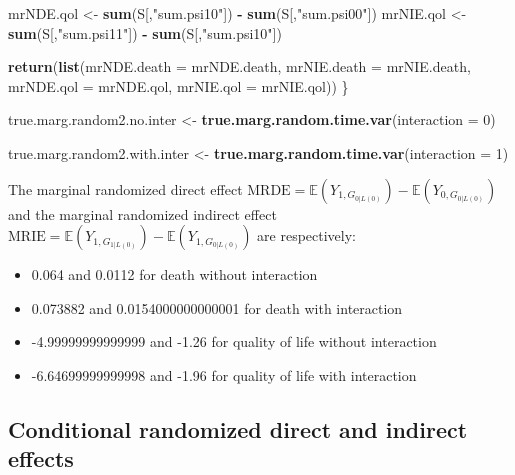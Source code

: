 \documentclass[
]{book}
\newenvironment{Shaded}{\begin{snugshade}}{\end{snugshade}}
\newcommand{\AttributeTok}[1]{\textcolor[rgb]{0.13,0.29,0.53}{#1}}
\newcommand{\DecValTok}[1]{\textcolor[rgb]{0.00,0.00,0.81}{#1}}
\newcommand{\FunctionTok}[1]{\textcolor[rgb]{0.13,0.29,0.53}{\textbf{#1}}}
\newcommand{\NormalTok}[1]{#1}
\newcommand{\OtherTok}[1]{\textcolor[rgb]{0.56,0.35,0.01}{#1}}
\newcommand{\SpecialCharTok}[1]{\textcolor[rgb]{0.81,0.36,0.00}{\textbf{#1}}}
\newcommand{\StringTok}[1]{\textcolor[rgb]{0.31,0.60,0.02}{#1}}
\providecommand{\tightlist}{%
  \setlength{\itemsep}{0pt}\setlength{\parskip}{0pt}}
\begin{document}
\begin{Shaded}
\begin{Highlighting}[]
\NormalTok{  mrNDE.qol }\OtherTok{\textless{}{-}} \FunctionTok{sum}\NormalTok{(S[,}\StringTok{"sum.psi10"}\NormalTok{]) }\SpecialCharTok{{-}} \FunctionTok{sum}\NormalTok{(S[,}\StringTok{"sum.psi00"}\NormalTok{])}
\NormalTok{  mrNIE.qol }\OtherTok{\textless{}{-}} \FunctionTok{sum}\NormalTok{(S[,}\StringTok{"sum.psi11"}\NormalTok{]) }\SpecialCharTok{{-}} \FunctionTok{sum}\NormalTok{(S[,}\StringTok{"sum.psi10"}\NormalTok{])}
  
  \FunctionTok{return}\NormalTok{(}\FunctionTok{list}\NormalTok{(}\AttributeTok{mrNDE.death =}\NormalTok{ mrNDE.death, }\AttributeTok{mrNIE.death =}\NormalTok{ mrNIE.death, }
              \AttributeTok{mrNDE.qol =}\NormalTok{ mrNDE.qol, }\AttributeTok{mrNIE.qol =}\NormalTok{ mrNIE.qol))}
\NormalTok{\}}
\end{Highlighting}
\end{Shaded}

\begin{Shaded}
\begin{Highlighting}[]
\NormalTok{true.marg.random2.no.inter }\OtherTok{\textless{}{-}} \FunctionTok{true.marg.random.time.var}\NormalTok{(}\AttributeTok{interaction =} \DecValTok{0}\NormalTok{)}

\NormalTok{true.marg.random2.with.inter }\OtherTok{\textless{}{-}} \FunctionTok{true.marg.random.time.var}\NormalTok{(}\AttributeTok{interaction =} \DecValTok{1}\NormalTok{)}
\end{Highlighting}
\end{Shaded}

The marginal randomized direct effect \(\text{MRDE}=\mathbb{E}\left(Y_{1,G_{0|L(0)}}\right) - \mathbb{E}\left(Y_{0,G_{0|L(0)}}\right)\) and the marginal randomized indirect effect \(\text{MRIE}=\mathbb{E}\left(Y_{1,G_{1|L(0)}}\right) - \mathbb{E}\left(Y_{1,G_{0|L(0)}}\right)\) are respectively:

\begin{itemize}
\tightlist
\item
  0.064 and 0.0112 for death without interaction
\item
  0.073882 and 0.0154000000000001 for death with interaction
\item
  -4.99999999999999 and -1.26 for quality of life without interaction
\item
  -6.64699999999998 and -1.96 for quality of life with interaction
\end{itemize}

\hypertarget{conditional-randomized-direct-and-indirect-effects-1}{%
\subsection{Conditional randomized direct and indirect effects}\label{conditional-randomized-direct-and-indirect-effects-1}}
\end{document}
